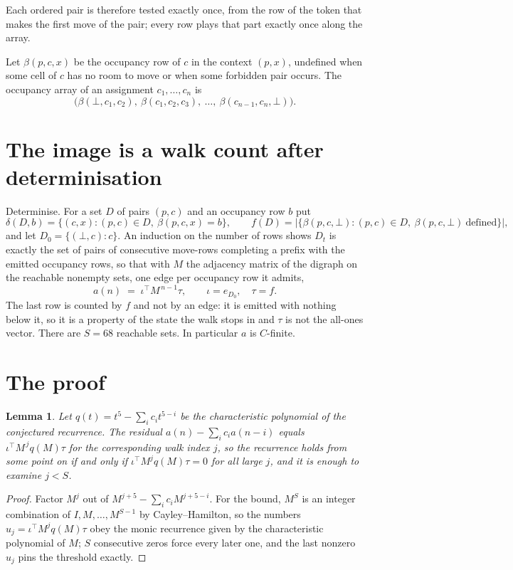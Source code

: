 \documentclass[11pt,a4paper]{article}
\theoremstyle{plain}
\newtheorem{lemma}[theorem]{Lemma}
\theoremstyle{definition}
\begin{document}
Each ordered pair is therefore tested exactly once, from the row of the token that makes the
first move of the pair; every row plays that part exactly once along the array.

Let $\beta(p,c,x)$ be the occupancy row of $c$ in the context $(p,x)$, undefined when some
cell of $c$ has no room to move or when some forbidden pair occurs. The occupancy array of an
assignment $c_1,\dots,c_n$ is
\[
\bigl(\beta(\bot,c_1,c_2),\ \beta(c_1,c_2,c_3),\ \dots,\ \beta(c_{n-1},c_n,\bot)\bigr).
\]

\section{The image is a walk count after determinisation}

Determinise. For a set $D$ of pairs $(p,c)$ and an occupancy row $b$ put
\[
\delta(D,b)=\{(c,x):(p,c)\in D,\ \beta(p,c,x)=b\},\qquad
f(D)=\bigl|\{\beta(p,c,\bot):(p,c)\in D,\ \beta(p,c,\bot)\ \text{defined}\}\bigr| ,
\]
and let $D_0=\{(\bot,c):c\}$. An induction on the number of rows shows $D_t$ is exactly the
set of pairs of consecutive move-rows completing a prefix with the emitted occupancy rows, so
that with $M$ the adjacency matrix of the digraph on the reachable nonempty sets, one edge per
occupancy row it admits,
\[
a(n)\;=\;\iota^{\!\top}M^{\,n-1}\tau,\qquad \iota=e_{D_0},\quad \tau=f .
\]
The last row is counted by $f$ and not by an edge: it is emitted with nothing below it, so it
is a property of the state the walk stops in and $\tau$ is not the all-ones vector. There are
$S=68$ reachable sets. In particular $a$ is $C$-finite.

\section{The proof}

\begin{lemma}\label{lem:crit}
Let $q(t)=t^{5}-\sum_i c_it^{5-i}$ be the characteristic polynomial of the
conjectured recurrence. The residual $a(n)-\sum_ic_ia(n-i)$ equals
$\iota^{\!\top}M^{\,j}q(M)\tau$ for the corresponding walk index $j$, so the recurrence
holds from some point on if and only if $\iota^{\!\top}M^{j}q(M)\tau=0$ for all large $j$,
and it is enough to examine $j<S$.
\end{lemma}

\begin{proof}
Factor $M^{j}$ out of $M^{j+5}-\sum_ic_iM^{j+5-i}$. For the bound, $M^{S}$
is an integer combination of $I,M,\dots,M^{S-1}$ by Cayley--Hamilton, so the numbers
$u_j=\iota^{\!\top}M^{j}q(M)\tau$ obey the monic recurrence given by the characteristic
polynomial of $M$; $S$ consecutive zeros force every later one, and the last nonzero $u_j$
pins the threshold exactly.
\end{proof}
\end{document}
